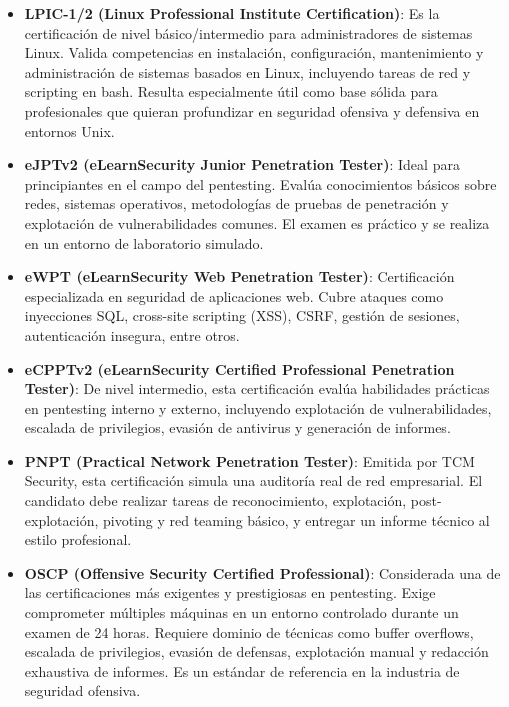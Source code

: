 \documentclass[a4paper, 10pt]{article}
\begin{document}
\begin{itemize}
    \item \textbf{LPIC-1/2 (Linux Professional Institute Certification)}: Es la certificación de nivel básico/intermedio para administradores de sistemas Linux. Valida competencias en instalación, configuración, mantenimiento y administración de sistemas basados en Linux, incluyendo tareas de red y scripting en bash. Resulta especialmente útil como base sólida para profesionales que quieran profundizar en seguridad ofensiva y defensiva en entornos Unix. \cite{lpic}

    \item \textbf{eJPTv2 (eLearnSecurity Junior Penetration Tester)}: Ideal para principiantes en el campo del pentesting. Evalúa conocimientos básicos sobre redes, sistemas operativos, metodologías de pruebas de penetración y explotación de vulnerabilidades comunes. El examen es práctico y se realiza en un entorno de laboratorio simulado.\cite{ejptv2}

    \item \textbf{eWPT (eLearnSecurity Web Penetration Tester)}: Certificación especializada en seguridad de aplicaciones web. Cubre ataques como inyecciones SQL, cross-site scripting (XSS), CSRF, gestión de sesiones, autenticación insegura, entre otros. \cite{ewpt}

    \item \textbf{eCPPTv2 (eLearnSecurity Certified Professional Penetration Tester)}: De nivel intermedio, esta certificación evalúa habilidades prácticas en pentesting interno y externo, incluyendo explotación de vulnerabilidades, escalada de privilegios, evasión de antivirus y generación de informes. \cite{ecpptv2}

    \item \textbf{PNPT (Practical Network Penetration Tester)}: Emitida por TCM Security, esta certificación simula una auditoría real de red empresarial. El candidato debe realizar tareas de reconocimiento, explotación, post-explotación, pivoting y red teaming básico, y entregar un informe técnico al estilo profesional. \cite{pnpt}

    \item \textbf{OSCP (Offensive Security Certified Professional)}: Considerada una de las certificaciones más exigentes y prestigiosas en pentesting. Exige comprometer múltiples máquinas en un entorno controlado durante un examen de 24 horas. Requiere dominio de técnicas como buffer overflows, escalada de privilegios, evasión de defensas, explotación manual y redacción exhaustiva de informes. Es un estándar de referencia en la industria de seguridad ofensiva. \cite{oscp}
\end{itemize}
\end{document}
